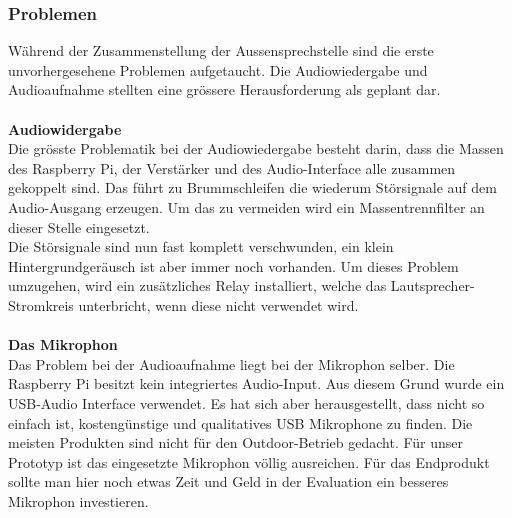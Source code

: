 \subsubsection{Problemen}
Während der Zusammenstellung der Aussensprechstelle sind die erste unvorhergesehene Problemen aufgetaucht. Die Audiowiedergabe und Audioaufnahme stellten eine grössere Herausforderung als geplant dar.
\\
\\
\textbf{Audiowidergabe} 
\\
Die grösste Problematik bei der Audiowiedergabe besteht darin, dass die Massen des Raspberry Pi, der Verstärker und des Audio-Interface alle zusammen gekoppelt sind. Das führt zu Brummschleifen die wiederum Störsignale auf dem Audio-Ausgang erzeugen. Um das zu vermeiden wird ein Massentrennfilter an dieser Stelle eingesetzt.
\\
Die Störsignale sind nun fast komplett verschwunden, ein klein Hintergrundgeräusch ist aber immer noch vorhanden. Um dieses Problem umzugehen, wird ein zusätzliches Relay installiert, welche das Lautsprecher-Stromkreis unterbricht, wenn diese nicht verwendet wird.
\\
\\
\textbf{Das Mikrophon}
\\
Das Problem bei der Audioaufnahme liegt bei der Mikrophon selber. Die Raspberry Pi besitzt kein integriertes Audio-Input. Aus diesem Grund wurde ein USB-Audio Interface verwendet. Es hat sich aber herausgestellt, dass nicht so einfach ist, kostengünstige und qualitatives USB Mikrophone zu finden. Die meisten Produkten sind nicht für den Outdoor-Betrieb gedacht. Für unser Prototyp ist das eingesetzte Mikrophon völlig ausreichen. Für das Endprodukt sollte man hier noch etwas Zeit und Geld in der Evaluation ein besseres Mikrophon investieren.
\newpage